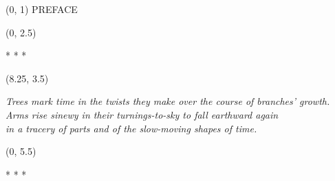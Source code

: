 \documentclass[10pt]{article}
\begin{document}
\begin{textblock}{23}(0, 1)
\center \huge PREFACE
\end{textblock}

\begin{textblock}{23}(0, 2.5)
\begin{center}
* * *
\end{center}
\end{textblock}

\begin{textblock}{6.5}(8.25, 3.5) \begin{center} \textit{Trees mark time in the
twists they make over the course of branches' growth. Arms rise sinewy in their
turnings-to-sky to fall earthward again \\ in a tracery of parts and of the
slow-moving shapes of time. } \end{center} \end{textblock}

\begin{textblock}{23}(0, 5.5)
\begin{center}
* * *
\end{center}
\end{textblock}
\end{document}

